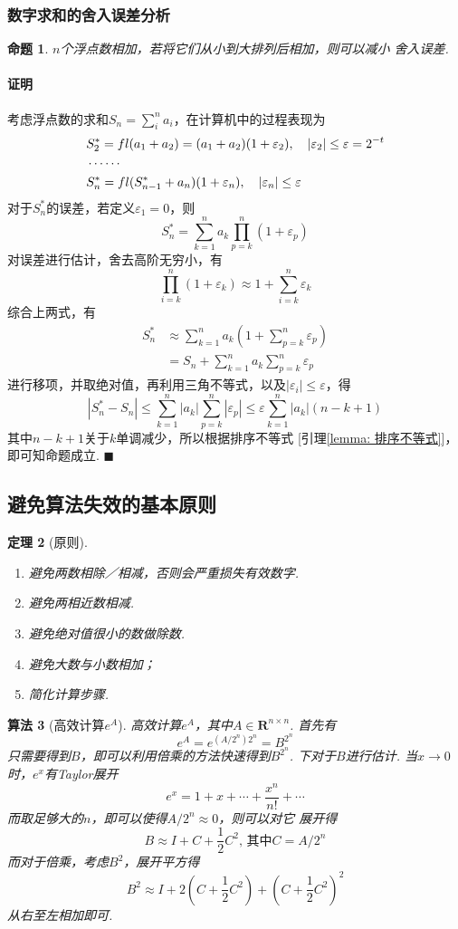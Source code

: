 \documentclass[12pt, a4paper]{article}
\theoremstyle{margin}
\newtheorem{thm}{定理}
\newtheorem{pos}[thm]{命题}
\newtheorem{alg}[thm]{算法}
\newcommand{\fl}{\mathnormal{fl}}
\newcommand{\R}{\mathbf{R}}
\newcommand{\str}{^*}
\newcommand{\vep}{\varepsilon}
\newcommand\lemmaref[1]{引理\ref{#1}}
\newcommand{\proof}{\paragraph{证明}}
\begin{document}
\subsubsection{数字求和的舍入误差分析}
  \begin{pos}
    $n$个浮点数相加，若将它们从小到大排列后相加，则可以减小
    舍入误差.
  \end{pos}
  \proof
    考虑浮点数的求和$S_n=\sum_i^n a_i$，在计算机中的过程表现为
    \[\begin{split}
      & S_2^* = \fl(a_1+a_2)=(a_1+a_2)(1+\vep_2),\quad|\vep_2|\le\vep=2^{-t}\\
      & \cdots\cdots\\
      & S_n^* = \fl(S_{n-1}^*+a_n)(1+\vep_n),\quad|\vep_n|\le\vep
    \end{split}\]
    对于$S_n\str$的误差，若定义$\vep_1=0$，则
    \[
      S_n\str=\sum_{k=1}^n a_k\prod_{p=k}^n(1+\vep_p)
    \]
    对误差进行估计，舍去高阶无穷小，有
    \[
      \prod_{i=k}^n(1+\vep_k)\approx1+\sum_{i=k}^n\vep_k
    \]
    综合上两式，有
    \[\begin{split}
      S_n\str & \approx\sum_{k=1}^na_k(1+\sum_{p=k}^n\vep_p)\\
      & = S_n + \sum_{k=1}^na_k\sum_{p=k}^n\vep_p
    \end{split}\]
    进行移项，并取绝对值，再利用三角不等式，以及$|\vep_i|\le\vep$，得
    \[
      \left|S_n\str-S_n\right|
      \le \sum_{k=1}^n|a_k|\sum_{p=k}^n|\vep_p|
      \le \vep\sum_{k=1}^n|a_k|(n-k+1)
    \]
    其中$n-k+1$关于$k$单调减少，所以根据排序不等式
    [\lemmaref{lemma: 排序不等式}]，即可知命题成立. $\blacksquare$

\newpage
\subsection{避免算法失效的基本原则}
  \begin{thm}[原则]
    $\,$
    \begin{enumerate}
      \item 避免两数相除／相减，否则会严重损失有效数字.
      \item 避免两相近数相减.
      \item 避免绝对值很小的数做除数.
      \item 避免大数与小数相加；
      \item 简化计算步骤.
    \end{enumerate}
  \end{thm}


  \begin{alg}[高效计算$e^A$]
    高效计算$e^A$，其中$A\in\R^{n\times n}$. 首先有
    \[
      e^A = e^{(A/2^n)2^n} = B^{2^n}
    \]
    只需要得到$B$，即可以利用倍乘的方法快速得到$B^{2^n}$.
    下对于$B$进行估计. 当$x\to0$时，$e^x$有Taylor展开
    \[
      e^x = 1 + x + \cdots + \frac{x^n}{n!} + \cdots
    \]
    而取足够大的$n$，即可以使得$A/2^n\approx0$，则可以对它
    展开得
    \[
      B \approx I + C + \frac{1}{2}C^2,\,\text{其中}
      C = A/2^n
    \]
    而对于倍乘，考虑$B^2$，展开平方得
    \[
      B^2 \approx I + 2(C+\frac{1}{2}C^2) + (C+\frac{1}{2}C^2)^2
    \]
    从右至左相加即可.
  \end{alg}
\end{document}
